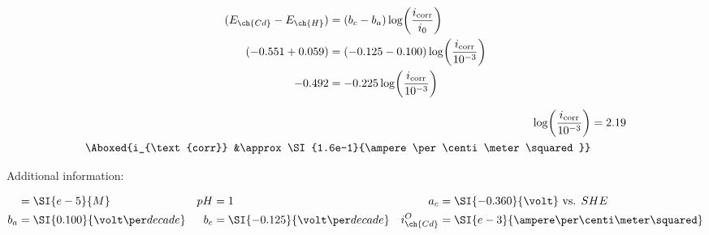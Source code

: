 \begin{enumerate}
{\begin{align*}
  (E_{\ch{Cd}} - E_{\ch{H}})
  &= (b_c - b_a)\log\!\left(\frac{i_{\text{corr}}}{i_0}\right) \\
  (-0.551 + 0.059)
  &= (-0.125 - 0.100)\log\!\left(\frac{i_{\text{corr}}}{10^{-3}}\right) \\
  -0.492 &= -0.225 \log\!\left(\frac{i_{\text{corr}}}{10^{-3}}\right)
\end{align*}

\begin{align*}
  \log\!\left(\frac{i_{\text{corr}}}{10^{-3}}\right) &= 2.19 \\
  \Aboxed{i_{\text{corr}} &\approx \SI{1.6e-1}{\ampere\per\centi\meter\squared}}
\end{align*}
}


    Additional information:

    \begin{align*}
        [\ch{Cd^{2+}}] &= \SI{e-5}{M} & pH &=  1 & a_c &=
      \SI{-0.360}{\volt} \text{ vs. } SHE \\
      b_a &= \SI{0.100}{\volt\per decade} & b_c &=
      \SI{-0.125}{\volt\per decade} & i_{\ch{Cd}}^O &=
      \SI{e-3}{\ampere\per\centi\meter\squared} \\
    \end{align*}
\end{enumerate}


